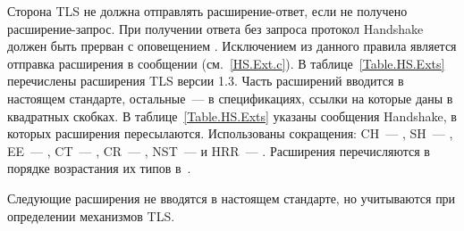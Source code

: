 Сторона TLS не должна отправлять расширение-ответ, если не получено
расширение-запрос. При получении ответа без запроса протокол Handshake должен 
быть прерван с оповещением .
Исключением из данного правила является отправка расширения 
 в сообщении  
(см.~\ref{HS.Ext.c}).
%
В таблице~\ref{Table.HS.Exts} перечислены расширения TLS версии 1.3.
Часть расширений вводится в настоящем стандарте, остальные~--- 
в спецификациях, ссылки на которые даны в квадратных скобках.
В таблице~\ref{Table.HS.Exts} указаны сообщения Handshake, в которых 
расширения пересылаются. 
%
Использованы сокращения: 
CH~--- ,
SH~--- ,
EE~--- , 
CT~--- ,
CR~--- , 
NST~---  и
HRR~--- . 
%
Расширения перечисляются в порядке возрастания их типов
в~.

Следующие расширения не вводятся в настоящем стандарте, но учитываются при 
определении механизмов TLS.

